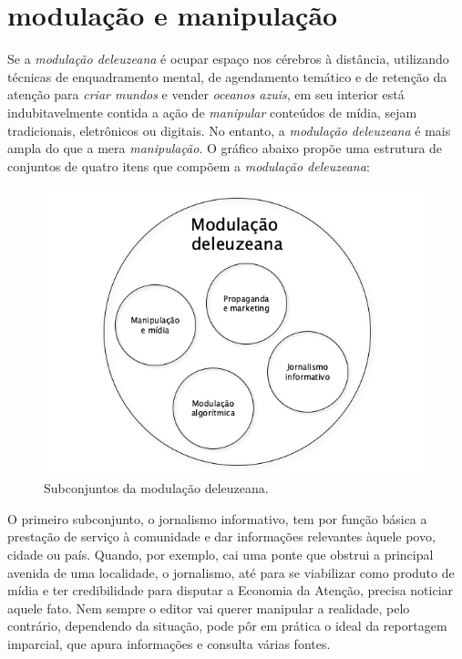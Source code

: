 \section{modulação e manipulação}

Se a \textit{modulação deleuzeana} é ocupar espaço nos cérebros à
distância, utilizando técnicas de enquadramento mental, de agendamento
temático e de retenção da atenção para \textit{criar mundos} e vender
\textit{oceanos azuis}, em seu interior está indubitavelmente contida a
ação de \textit{manipular} conteúdos de mídia, sejam tradicionais,
eletrônicos ou digitais. No entanto, a \textit{modulação deleuzeana} é
mais ampla do que a mera \textit{manipulação}. O gráfico abaixo propõe uma
estrutura de conjuntos de quatro itens que compõem a \textit{modulação
deleuzeana}: \enlargethispage{\baselineskip}

\begin{figure}[!ht]
\centering
\includegraphics[width=\textwidth]{./imgs/GRAFICO_2.png}
\caption{\formular\footnotesize{Subconjuntos da modulação deleuzeana.}}
\end{figure}

O primeiro subconjunto, o jornalismo informativo, tem por função básica
a prestação de serviço à comunidade e dar informações relevantes àquele
povo, cidade ou país. Quando, por exemplo, cai uma ponte que obstrui a
principal avenida de uma localidade, o jornalismo, até para se
viabilizar como produto de mídia e ter credibilidade para disputar a
Economia da Atenção, precisa noticiar aquele fato. Nem sempre o editor
vai querer manipular a realidade, pelo contrário, dependendo da
situação, pode pôr em prática o ideal da reportagem imparcial, que apura
informações e consulta várias fontes.

